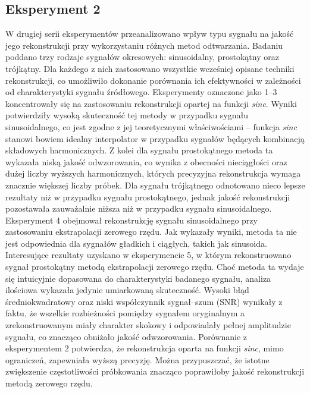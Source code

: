 \documentclass{article}
\begin{document}
    \subsection{Eksperyment 2}
    W drugiej serii eksperymentów przeanalizowano wpływ typu sygnału na jakość jego rekonstrukcji przy 
    wykorzystaniu różnych metod odtwarzania. Badaniu poddano trzy rodzaje sygnałów okresowych: sinusoidalny, 
    prostokątny oraz trójkątny. Dla każdego z nich zastosowano wszystkie wcześniej opisane techniki 
    rekonstrukcji, co umożliwiło dokonanie porównania ich efektywności w zależności od charakterystyki 
    sygnału źródłowego.
    Eksperymenty oznaczone jako 1–3 koncentrowały się na zastosowaniu rekonstrukcji opartej na funkcji
    \emph{sinc}. Wyniki potwierdziły wysoką skuteczność tej metody w przypadku sygnału sinusoidalnego, 
    co jest zgodne z jej teoretycznymi właściwościami – funkcja \emph{sinc} stanowi bowiem idealny 
    interpolator w przypadku sygnałów będących kombinacją składowych harmonicznych. Z kolei dla sygnału
    prostokątnego metoda ta wykazała niską jakość odwzorowania, co wynika z obecności nieciągłości oraz
    dużej liczby wyższych harmonicznych, których precyzyjna rekonstrukcja wymaga znacznie większej liczby 
    próbek. Dla sygnału trójkątnego odnotowano nieco lepsze rezultaty niż w przypadku sygnału 
    prostokątnego, jednak jakość rekonstrukcji pozostawała zauważalnie niższa niż w przypadku sygnału 
    sinusoidalnego.
    Eksperyment 4 obejmował rekonstrukcję sygnału sinusoidalnego przy zastosowaniu ekstrapolacji zerowego
    rzędu. Jak wykazały wyniki, metoda ta nie jest odpowiednia dla sygnałów gładkich i ciągłych, takich
    jak sinusoida. Interesujące rezultaty uzyskano w eksperymencie 5, w którym rekonstruowano sygnał 
    prostokątny metodą ekstrapolacji zerowego rzędu. Choć metoda ta wydaje się intuicyjnie dopasowana do 
    charakterystyki badanego sygnału, analiza ilościowa wykazała jedynie umiarkowaną skuteczność. 
    Wysoki błąd średniokwadratowy oraz niski współczynnik sygnał–szum (SNR) wynikały z faktu, że wszelkie 
    rozbieżności pomiędzy sygnałem oryginalnym a zrekonstruowanym miały charakter skokowy i odpowiadały 
    pełnej amplitudzie sygnału, co znacząco obniżało jakość odwzorowania. Porównanie z eksperymentem 2 
    potwierdza, że rekonstrukcja oparta na funkcji \emph{sinc}, mimo ograniczeń, zapewniała wyższą 
    precyzję. Można przypuszczać, że istotne zwiększenie częstotliwości próbkowania znacząco 
    poprawiłoby jakość rekonstrukcji metodą zerowego rzędu.
\end{document}
